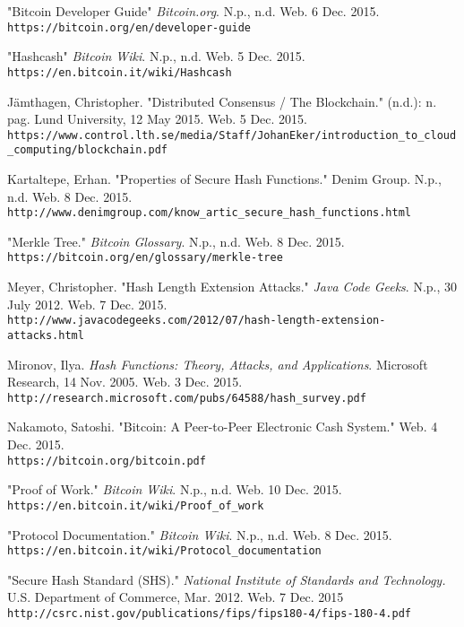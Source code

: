\documentclass[12pt]{article}
\begin{document}
\begin{thebibliography}{9}
"Bitcoin Developer Guide"
\textit{Bitcoin.org}.
N.p., n.d. Web. 6 Dec. 2015.
\\\texttt{https://bitcoin.org/en/developer-guide}

"Hashcash"
\textit{Bitcoin Wiki}.
N.p., n.d. Web. 5 Dec. 2015.
\\\texttt{https://en.bitcoin.it/wiki/Hashcash}

Jämthagen, Christopher. "Distributed Consensus / The Blockchain." (n.d.): n. pag. Lund University, 12 May 2015. Web. 5 Dec. 2015.
\\\texttt{https://www.control.lth.se/media/Staff/JohanEker/introduction\_to\_cloud\_computing/blockchain.pdf}

Kartaltepe, Erhan. "Properties of Secure Hash Functions." Denim Group. N.p., n.d. Web. 8 Dec. 2015.
\\\texttt{http://www.denimgroup.com/know\_artic\_secure\_hash\_functions.html}

"Merkle Tree."
\textit{Bitcoin Glossary}.
N.p., n.d. Web. 8 Dec. 2015.
\\\texttt{https://bitcoin.org/en/glossary/merkle-tree}

Meyer, Christopher. "Hash Length Extension Attacks."
\textit{Java Code Geeks}.
N.p., 30 July 2012. Web. 7 Dec. 2015.
\\\texttt{http://www.javacodegeeks.com/2012/07/hash-length-extension-attacks.html}

Mironov, Ilya.
\textit{Hash Functions: Theory, Attacks, and Applications}.
Microsoft Research, 14 Nov. 2005. Web. 3 Dec. 2015.
\\\texttt{http://research.microsoft.com/pubs/64588/hash\_survey.pdf}

Nakamoto, Satoshi. "Bitcoin: A Peer-to-Peer Electronic Cash System." Web. 4 Dec. 2015.
\\\texttt{https://bitcoin.org/bitcoin.pdf}

"Proof of Work."
\textit{Bitcoin Wiki}.
N.p., n.d. Web. 10 Dec. 2015.
\\\texttt{https://en.bitcoin.it/wiki/Proof\_of\_work}

"Protocol Documentation."
\textit{Bitcoin Wiki}.
N.p., n.d. Web. 8 Dec. 2015.
\\\texttt{https://en.bitcoin.it/wiki/Protocol\_documentation}

"Secure Hash Standard (SHS)."
\textit{National Institute of Standards and Technology.}
U.S. Department of Commerce, Mar. 2012. Web. 7 Dec. 2015
\\\texttt{http://csrc.nist.gov/publications/fips/fips180-4/fips-180-4.pdf}



\end{thebibliography}
\end{document}
